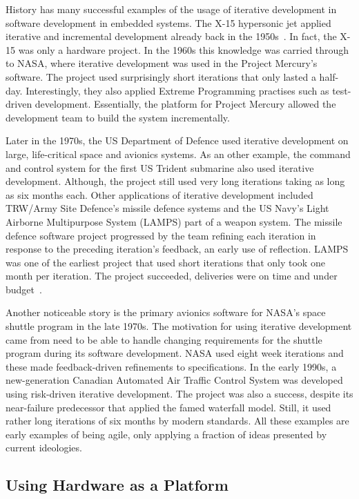 \documentclass[english]{tktltiki2}
\begin{document}
History has many successful examples of the usage of iterative development in software development in embedded systems. The X-15 hypersonic jet applied iterative and incremental development already back in the 1950s~\cite{LB03}. In fact, the X-15 was only a hardware project. In the 1960s this knowledge was carried through to NASA, where iterative development was used in the Project Mercury’s software. The project used surprisingly short iterations that only lasted a half-day. Interestingly, they also applied Extreme Programming practises such as test-driven development. Essentially, the platform for Project Mercury allowed the development team to build the system incrementally.

Later in the 1970s, the US Department of Defence used iterative development on large, life-critical space and avionics systems. As an other example, the command and control system for the first US Trident submarine also used iterative development. Although, the project still used very long iterations taking as long as six months each. Other applications of iterative development included TRW/Army Site Defence’s missile defence systems and the US Navy’s Light Airborne Multipurpose System (LAMPS) part of a weapon system. The missile defence software project progressed by the team refining each iteration in response to the preceding iteration’s feedback, an early use of reflection. LAMPS was one of the earliest project that used short iterations that only took one month per iteration. The project succeeded, deliveries were on time and under budget~\cite{LB03}.

Another noticeable story is the primary avionics software for NASA’s space shuttle program in the late 1970s. The motivation for using iterative development came from need to be able to handle changing requirements for the shuttle program during its software development. NASA used eight week iterations and these made feedback-driven refinements to specifications. In the early 1990s, a new-generation Canadian Automated Air Traffic Control System was developed using risk-driven iterative development. The project was also a success, despite its near-failure predecessor that applied the famed waterfall model. Still, it used rather long iterations of six months by modern standards. All these examples are early examples of being agile, only applying a fraction of ideas presented by current ideologies.

\subsection{Using Hardware as a Platform}
\end{document}

